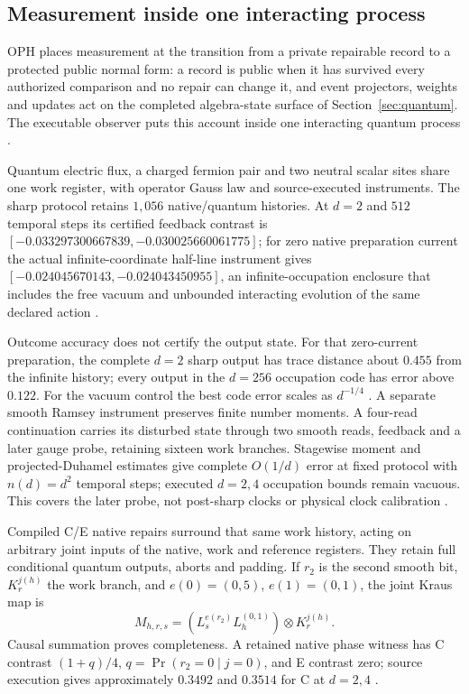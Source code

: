 \documentclass[11pt]{article}
\theoremstyle{definition}
\theoremstyle{remark}
\begin{document}
\subsection{Measurement inside one interacting process}
\label{sec:measurement-process}

OPH places measurement at the transition from a private repairable record to
a protected public normal form: a record is public when it has survived every
authorized comparison and no repair can change it, and event projectors,
weights and updates act on the completed algebra-state surface of
Section~\ref{sec:quantum}. The executable observer puts this account inside
one interacting quantum process \cite{ophspine}.

Quantum electric flux, a charged fermion pair and two neutral scalar sites
share one work register, with operator Gauss law and source-executed
instruments. The sharp protocol retains $1{,}056$ native/quantum
histories. At $d=2$ and $512$ temporal steps its certified feedback contrast
is $[-0.033297300667839,-0.030025660061775]$; for zero native preparation
current the actual infinite-coordinate half-line instrument gives
$[-0.024045670143,-0.024043450955]$, an infinite-occupation enclosure that
includes the free vacuum and unbounded interacting evolution of the same
declared action \cite{ophinfinite}.

Outcome accuracy does not certify the output state. For that zero-current
preparation, the complete $d=2$ sharp output has trace distance about $0.455$ from the infinite history;
every output in the $d=256$ occupation code has error above $0.122$.
For the vacuum control the best code error scales as $d^{-1/4}$
\cite{ophreadout}. A separate smooth Ramsey instrument preserves finite
number moments. A four-read continuation carries its disturbed state through
two smooth reads, feedback and a later gauge probe, retaining sixteen work
branches. Stagewise moment and projected-Duhamel estimates give complete
$O(1/d)$ error at fixed protocol with $n(d)=d^2$ temporal steps; executed
$d=2,4$ occupation bounds remain vacuous. This covers the later probe, not
post-sharp clocks or physical clock calibration \cite{ophcomposition}.

Compiled C/E native repairs surround that same work history, acting on
arbitrary joint inputs of the native, work and reference registers. They retain
full conditional quantum outputs, aborts and padding. If $r_2$ is the second smooth bit, $K_r^{j(h)}$ the work branch,
and $e(0)=(0,5)$, $e(1)=(0,1)$, the joint Kraus map is
\[
 M_{h,r,s}=(L_s^{e(r_2)}L_h^{(0,1)})\otimes K_r^{j(h)}.
\]
Causal summation proves completeness. A retained native phase witness has
C contrast $(1+q)/4$, $q=\Pr(r_2=0\mid j=0)$, and E contrast zero;
source execution gives approximately $0.3492$ and $0.3514$ for C at $d=2,4$
\cite{ophquantumnative}.
\end{document}
